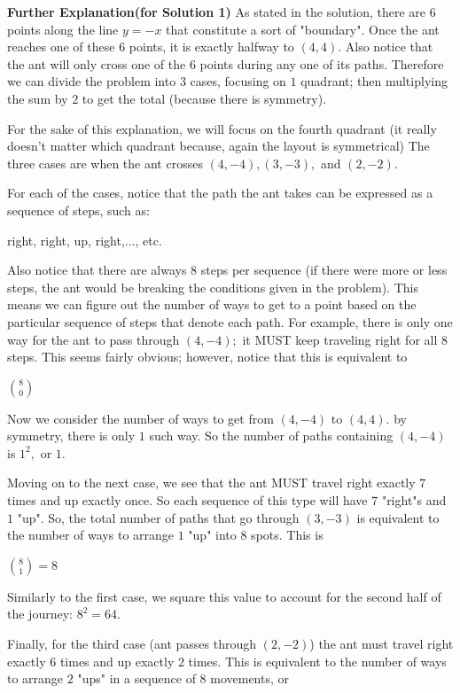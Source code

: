 \begin{enumerate}
 \textbf{Further Explanation(for Solution 1)} As stated in the solution, there are $6$ points along the line $y=-x$ that constitute a sort of "boundary". Once the ant reaches one of these $6$ points, it is exactly halfway to $(4, 4)$. Also notice that the ant will only cross one of the $6$ points during any one of its paths. Therefore we can divide the problem into $3$ cases, focusing on $1$ quadrant; then multiplying the sum by $2$ to get the total (because there is symmetry).

 
For the sake of this explanation, we will focus on the fourth quadrant (it really doesn't matter which quadrant because, again the layout is symmetrical) The three cases are when the ant crosses $(4, -4), (3, -3),$ and $(2, -2)$.

 
For each of the cases, notice that the path the ant takes can be expressed as a sequence of steps, such as:

 
right, right, up, right,..., etc.

 
Also notice that there are always $8$ steps per sequence (if there were more or less steps, the ant would be breaking the conditions given in the problem). This means we can figure out the number of ways to get to a point based on the particular sequence of steps that denote each path. For example, there is only one way for the ant to pass through $(4, -4);$ it MUST keep traveling right for all $8$ steps. This seems fairly obvious; however, notice that this is equivalent to

 
$\binom{8}{0}$

 
Now we consider the number of ways to get from $(4, -4)$ to $(4, 4)$. by symmetry, there is only $1$ such way. So the number of paths containing $(4, -4)$ is $1^2,$ or $1$.

 
Moving on to the next case, we see that the ant MUST travel right exactly $7$ times and up exactly once. So each sequence of this type will have $7$ "right"s and $1$ "up". So, the total number of paths that go through $(3, -3)$ is equivalent to the number of ways to arrange $1$ "up" into $8$ spots. This is

 
$\binom{8}{1} = 8$

 
Similarly to the first case, we square this value to account for the second half of the journey: $8^2 = 64$.

 
Finally, for the third case (ant passes through $(2, -2)$) the ant must travel right exactly $6$ times and up exactly $2$ times. This is equivalent to the number of ways to arrange $2$ "ups" in a sequence of $8$ movements, or


\end{enumerate}

